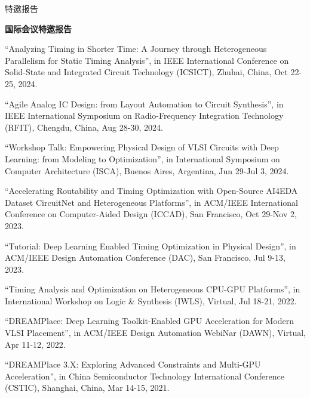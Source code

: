 \begin{rSection}{特邀报告}


\textbf{国际会议特邀报告}
        
\begin{description}[font=\normalfont]

\item[{[11]}]{
``Analyzing Timing in Shorter Time: A Journey through Heterogeneous Parallelism for Static Timing Analysis'', in IEEE International Conference on Solid-State and Integrated Circuit Technology (ICSICT), Zhuhai, China, Oct 22-25, 2024. 
}

\item[{[10]}]{
``Agile Analog IC Design: from Layout Automation to Circuit Synthesis'', in IEEE International Symposium on Radio-Frequency Integration Technology (RFIT), Chengdu, China, Aug 28-30, 2024. 
}

\item[{[9]}]{
``Workshop Talk: Empowering Physical Design of VLSI Circuits with Deep Learning: from Modeling to Optimization'', in International Symposium on Computer Architecture (ISCA), Buenos Aires, Argentina, Jun 29-Jul 3, 2024. 
}

\item[{[8]}]{
``Accelerating Routability and Timing Optimization with Open-Source AI4EDA Dataset CircuitNet and Heterogeneous Platforms'', in ACM/IEEE International Conference on Computer-Aided Design (ICCAD), San Francisco, Oct 29-Nov 2, 2023. 
}

\item[{[7]}]{
``Tutorial: Deep Learning Enabled Timing Optimization in Physical Design'', in ACM/IEEE Design Automation Conference (DAC), San Francisco, Jul 9-13, 2023. 
}

\item[{[6]}]{
``Timing Analysis and Optimization on Heterogeneous CPU-GPU Platforms'', in International Workshop on Logic \& Synthesis (IWLS), Virtual, Jul 18-21, 2022. 
}

\item[{[5]}]{
``DREAMPlace: Deep Learning Toolkit-Enabled GPU Acceleration for Modern VLSI Placement'', in ACM/IEEE Design Automation WebiNar (DAWN), Virtual, Apr 11-12, 2022. 
}

\item[{[4]}]{
``DREAMPlace 3.X: Exploring Advanced Constraints and Multi-GPU Acceleration'', in China Semiconductor Technology International Conference (CSTIC), Shanghai, China, Mar 14-15, 2021. 
}


\end{description}
\end{rSection}
